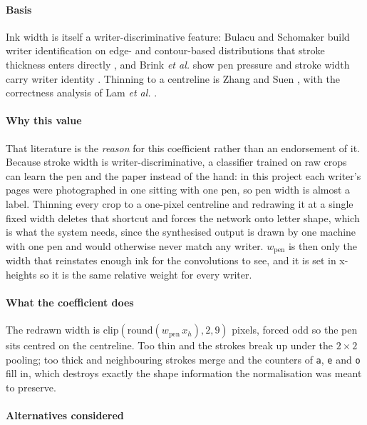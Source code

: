 \paragraph{Basis}

Ink width is itself a writer-discriminative feature: Bulacu and Schomaker build writer identification on edge- and contour-based distributions that stroke thickness enters directly \cite{bulacu2007}, and Brink \textit{et al.} show pen pressure and stroke width carry writer identity \cite{brink2012}. Thinning to a centreline is Zhang and Suen \cite{zhang1984}, with the correctness analysis of Lam \textit{et al.} \cite{lam1992}.

\paragraph{Why this value}

That literature is the \emph{reason} for this coefficient rather than an endorsement of it. Because stroke width is writer-discriminative, a classifier trained on raw crops can learn the pen and the paper instead of the hand: in this project each writer's pages were photographed in one sitting with one pen, so pen width is almost a label. Thinning every crop to a one-pixel centreline and redrawing it at a single fixed width deletes that shortcut and forces the network onto letter shape, which is what the system needs, since the synthesised output is drawn by one machine with one pen and would otherwise never match any writer. $w_{\text{pen}}$ is then only the width that reinstates enough ink for the convolutions to see, and it is set in x-heights so it is the same relative weight for every writer.

\paragraph{What the coefficient does}

The redrawn width is $\mathrm{clip}(\mathrm{round}(w_{\text{pen}}\,x_h),2,9)$ pixels, forced odd so the pen sits centred on the centreline. Too thin and the strokes break up under the $2\times2$ pooling; too thick and neighbouring strokes merge and the counters of \texttt{a}, \texttt{e} and \texttt{o} fill in, which destroys exactly the shape information the normalisation was meant to preserve.

\paragraph{Alternatives considered}

